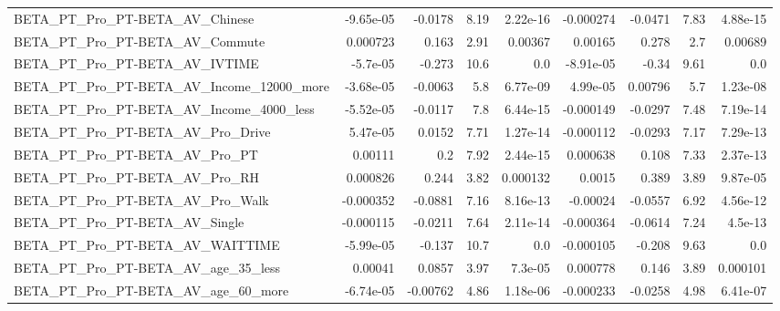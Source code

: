 \begin{tabular}{lrrrrrrrr}
BETA\_PT\_Pro\_PT-BETA\_AV\_Chinese                     &   -9.65e-05 &      -0.0178 &      8.19 & 2.22e-16 &  -0.000274 &     -0.0471 &         7.83 &      4.88e-15 \\
BETA\_PT\_Pro\_PT-BETA\_AV\_Commute                     &    0.000723 &        0.163 &      2.91 &  0.00367 &    0.00165 &       0.278 &          2.7 &       0.00689 \\
BETA\_PT\_Pro\_PT-BETA\_AV\_IVTIME                      &    -5.7e-05 &       -0.273 &      10.6 &      0.0 &  -8.91e-05 &       -0.34 &         9.61 &           0.0 \\
BETA\_PT\_Pro\_PT-BETA\_AV\_Income\_12000\_more           &   -3.68e-05 &      -0.0063 &       5.8 & 6.77e-09 &   4.99e-05 &     0.00796 &          5.7 &      1.23e-08 \\
BETA\_PT\_Pro\_PT-BETA\_AV\_Income\_4000\_less            &   -5.52e-05 &      -0.0117 &       7.8 & 6.44e-15 &  -0.000149 &     -0.0297 &         7.48 &      7.19e-14 \\
BETA\_PT\_Pro\_PT-BETA\_AV\_Pro\_Drive                   &    5.47e-05 &       0.0152 &      7.71 & 1.27e-14 &  -0.000112 &     -0.0293 &         7.17 &      7.29e-13 \\
BETA\_PT\_Pro\_PT-BETA\_AV\_Pro\_PT                      &     0.00111 &          0.2 &      7.92 & 2.44e-15 &   0.000638 &       0.108 &         7.33 &      2.37e-13 \\
BETA\_PT\_Pro\_PT-BETA\_AV\_Pro\_RH                      &    0.000826 &        0.244 &      3.82 & 0.000132 &     0.0015 &       0.389 &         3.89 &      9.87e-05 \\
BETA\_PT\_Pro\_PT-BETA\_AV\_Pro\_Walk                    &   -0.000352 &      -0.0881 &      7.16 & 8.16e-13 &   -0.00024 &     -0.0557 &         6.92 &      4.56e-12 \\
BETA\_PT\_Pro\_PT-BETA\_AV\_Single                      &   -0.000115 &      -0.0211 &      7.64 & 2.11e-14 &  -0.000364 &     -0.0614 &         7.24 &       4.5e-13 \\
BETA\_PT\_Pro\_PT-BETA\_AV\_WAITTIME                    &   -5.99e-05 &       -0.137 &      10.7 &      0.0 &  -0.000105 &      -0.208 &         9.63 &           0.0 \\
BETA\_PT\_Pro\_PT-BETA\_AV\_age\_35\_less                 &     0.00041 &       0.0857 &      3.97 &  7.3e-05 &   0.000778 &       0.146 &         3.89 &      0.000101 \\
BETA\_PT\_Pro\_PT-BETA\_AV\_age\_60\_more                 &   -6.74e-05 &     -0.00762 &      4.86 & 1.18e-06 &  -0.000233 &     -0.0258 &         4.98 &      6.41e-07 \\

\end{tabular}
